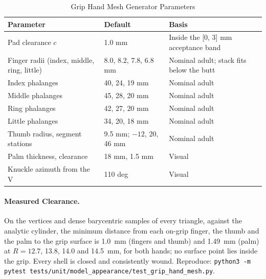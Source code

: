 \documentclass[11pt,a4paper]{article}
\begin{document}
\begin{table}[h]
\centering
\begin{tabular}{lll}
\hline
Parameter & Default & Basis \\
\hline
Pad clearance $c$ & 1.0 mm & Inside the [0, 3] mm acceptance band \\
Finger radii (index, middle, ring, little) & 8.0, 8.2, 7.8, 6.8 mm & Nominal adult; stack fits below the butt \\
Index phalanges & 40, 24, 19 mm & Nominal adult \\
Middle phalanges & 45, 28, 20 mm & Nominal adult \\
Ring phalanges & 42, 27, 20 mm & Nominal adult \\
Little phalanges & 34, 20, 18 mm & Nominal adult \\
Thumb radius, segment stations & 9.5 mm; $-12$, 20, 46 mm & Nominal adult \\
Palm thickness, clearance & 18 mm, 1.5 mm & Visual \\
Knuckle azimuth from the V & 110 deg & Visual \\
\hline
\end{tabular}
\caption{Grip Hand Mesh Generator Parameters}
\end{table}

\paragraph{Measured Clearance.} On the vertices and dense barycentric samples
of every triangle, against the analytic cylinder, the minimum distance from
each on-grip finger, the thumb and the palm to the grip surface is 1.0~mm
(fingers and thumb) and 1.49~mm (palm) at $R=12.7$, 13.8, 14.0 and 14.5~mm,
for both hands; no surface point lies inside the grip. Every shell is closed
and consistently wound. Reproduce:
\texttt{python3 -m pytest tests/unit/model\_appearance/test\_grip\_hand\_mesh.py}.
\end{document}
